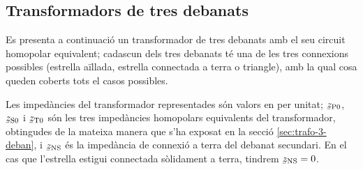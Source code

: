 \begin{center}
    
\end{center}

\begin{center}
    
\end{center}




\subsection{Transformadors de tres debanats}\label{sec:cir-hom-3-deb}

Es presenta a continuació un transformador de tres debanats amb el seu circuit homopolar equivalent; cadascun dels tres debanats té una de les tres connexions possibles (estrella aïllada, estrella connectada a terra o triangle), amb la qual cosa queden coberts tots el casos possibles.

Les impedàncies del transformador representades són valors en per unitat; $\cmplx{z}\ped{P0}$, $\cmplx{z}\ped{S0}$ i $\cmplx{z}\ped{T0}$ són les tres impedàncies homopolars equivalents del transformador, obtingudes de la mateixa manera que s'ha exposat en la secció \ref{sec:trafo-3-deban}, i $\cmplx{z}\ped{NS}$ és  la impedància de connexió a terra del debanat secundari. En el cas que l'estrella estigui connectada sòlidament a terra, tindrem $\cmplx{z}\ped{NS}=0$.

\begin{center}
    
\end{center}
